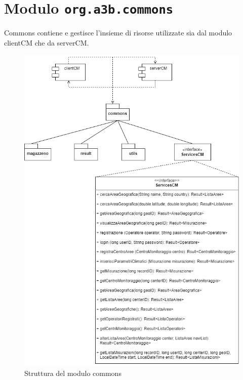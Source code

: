 \chapter{Modulo \texttt{org.a3b.commons}}
\label{ch:commons}
Commons contiene e gestisce l'insieme di risorse utilizzate sia dal modulo clientCM che da serverCM.
\begin{figure}[h]
	\centering
	\caption{Struttura del modulo commons}
	\label{fig:commonscm}
	\includegraphics[width=0.85\linewidth]{../../fig/img/tecnico/CM.drawio}
\end{figure}


